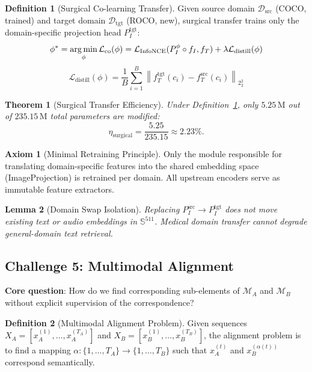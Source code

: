 \documentclass[12pt,a4paper]{article}
\theoremstyle{definition}
\newtheorem{definition}{Definition}[section]
\newtheorem{axiom}{Axiom}[section]
\theoremstyle{plain}
\newtheorem{theorem}{Theorem}[section]
\newtheorem{lemma}[theorem]{Lemma}
\theoremstyle{remark}
\newcommand{\Sph}{\mathbb{S}}
\newcommand{\Norm}[1]{\left\|#1\right\|_2}
\newcommand{\argmin}{\operatornamewithlimits{arg\,min}}
\newcommand{\MA}{\mathcal{M}_A}
\newcommand{\MB}{\mathcal{M}_B}
\begin{document}
\begin{definition}[Surgical Co-learning Transfer]
\label{def:surgical}
Given source domain $\mathcal{D}_{\text{src}}$ (COCO, trained) and target domain $\mathcal{D}_{\text{tgt}}$ (ROCO, new), surgical transfer trains only the domain-specific projection head $P_I^{\text{tgt}}$:
\[
  \phi^* = \argmin_\phi \mathcal{L}_{\text{co}}(\phi) = \mathcal{L}_{\text{InfoNCE}}(P_I^\phi \circ f_I, f_T) + \lambda \mathcal{L}_{\text{distill}}(\phi)
\]
\[
  \mathcal{L}_{\text{distill}}(\phi) = \frac{1}{B}\sum_{i=1}^B \Norm{f_T^{\text{tgt}}(c_i) - f_T^{\text{src}}(c_i)}_2^2
\]
\end{definition}

\begin{theorem}[Surgical Transfer Efficiency]
Under Definition~\ref{def:surgical}, only $5.25\,\text{M}$ out of $235.15\,\text{M}$ total parameters are modified:
\[
  \eta_{\text{surgical}} = \frac{5.25}{235.15} \approx 2.23\%.
\]
\end{theorem}

\begin{axiom}[Minimal Retraining Principle]
Only the module responsible for translating domain-specific features into the shared embedding space (ImageProjection) is retrained per domain. All upstream encoders serve as immutable feature extractors.
\end{axiom}

\begin{lemma}[Domain Swap Isolation]
Replacing $P_I^{\text{src}} \to P_I^{\text{tgt}}$ does not move existing text or audio embeddings in $\Sph^{511}$. Medical domain transfer cannot degrade general-domain text retrieval.
\end{lemma}

\subsection{Challenge 5: Multimodal Alignment}

\begin{tcolorbox}[challengebox,title={Challenge 5: Alignment}]
\textbf{Core question}: How do we find corresponding sub-elements of $\MA$ and $\MB$ without explicit supervision of the correspondence?
\end{tcolorbox}

\begin{definition}[Multimodal Alignment Problem]
Given sequences $X_A = [x_A^{(1)},\ldots,x_A^{(T_A)}]$ and $X_B = [x_B^{(1)},\ldots,x_B^{(T_B)}]$, the alignment problem is to find a mapping $\alpha : \{1,\ldots,T_A\} \to \{1,\ldots,T_B\}$ such that $x_A^{(t)}$ and $x_B^{(\alpha(t))}$ correspond semantically.
\end{definition}
\end{document}
